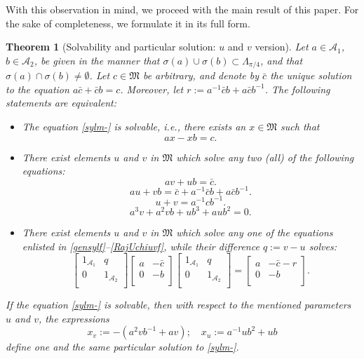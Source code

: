 \documentclass{article}
\newtheorem{theorem}{Theorem}[section]
\theoremstyle{definition}
\def\A{{\mathcal{A}}}
\def\M{\mathfrak{M}}
\newcommand{\mat}[4]{\left[\begin{array}{cc}#1 & #2 \\ #3 & #4 \\
	\end{array}\right]}
\begin{document}
With this observation in mind, we proceed with the main result of this paper. For the sake of completeness, we formulate it in its full form.

\begin{theorem} [Solvability and particular solution: $u$ and $v$ version]\label{upmv}
Let $a\in\A_1$, $b\in\A_2$, be given in the manner that $\sigma(a)\cup\sigma(b)\subset\Lambda_{\pi/4}$, and that $\sigma(a)\cap\sigma(b)\neq\emptyset$. Let  $c\in\M$ be arbitrary, and denote by $\bar{c}$ the unique solution to the equation $a\bar{c}+\bar{c}b=c$.  Moreover, let $r:=a^{-1}\bar{c}b+ a\bar{c}b^{-1}$. The following statements are equivalent: 
\begin{itemize}
\item[(a)] The equation \eqref{sylm-} is solvable, i.e., there exists an $x\in\M$ such that $$ax-xb=c.$$
\item[(b)] There exist elements $u$ and $v$ in $\M$ which solve any two (all) of the following equations:
\begin{equation}\label{gensylf}
av+ub=\bar{c}.
\end{equation}
\begin{equation}\label{gensylvuf}
au+vb=\bar{c}+a^{-1}\bar{c}b+a\bar{c}b^{-1}.
\end{equation}
 \begin{equation}\label{u+vf}
u+v=a^{-1}cb^{-1}.
\end{equation}
 \begin{equation}\label{RajUchiuvf}
a^3v+a^2vb+ub^3+aub^2=0.
\end{equation}
\item[(c)] There exist elements $u$ and $v$ in $\M$ which solve any one of the equations enlisted in \eqref{gensylf}--\eqref{RajUchiuvf}, while their difference $q:=v-u$ solves:
\begin{equation}\label{v-u}
\mat{1_{\A_1}}{q}{0}{1_{\A_2}}\mat{a}{-\bar{c}}{0}{-b}\mat{1_{\A_1}}{q}{0}{1_{\A_2}}=\mat{a}{-\bar{c}-r}{0}{-b}.
\end{equation}
\end{itemize}
If the equation \eqref{sylm-} is solvable, then with respect to the mentioned parameters $u$ and $v$, the expressions
\begin{equation}\label{solutionsuvab}
x_v:=-(a^2vb^{-1}+av);\quad x_u:=a^{-1}ub^2+ub
\end{equation}
define one and the same particular solution to \eqref{sylm-}.
\end{theorem}
\end{document}
